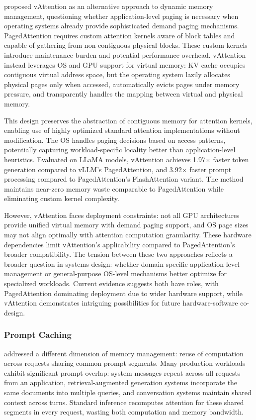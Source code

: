 \documentclass[11pt,letterpaper]{article}
\begin{document}
\cite{liu2024vattention} proposed vAttention as an alternative approach to dynamic memory management, questioning whether application-level paging is necessary when operating systems already provide sophisticated demand paging mechanisms. PagedAttention requires custom attention kernels aware of block tables and capable of gathering from non-contiguous physical blocks. These custom kernels introduce maintenance burden and potential performance overhead. vAttention instead leverages OS and GPU support for virtual memory: KV cache occupies contiguous virtual address space, but the operating system lazily allocates physical pages only when accessed, automatically evicts pages under memory pressure, and transparently handles the mapping between virtual and physical memory.

This design preserves the abstraction of contiguous memory for attention kernels, enabling use of highly optimized standard attention implementations without modification. The OS handles paging decisions based on access patterns, potentially capturing workload-specific locality better than application-level heuristics. Evaluated on LLaMA models, vAttention achieves 1.97$\times$ faster token generation compared to vLLM's PagedAttention, and 3.92$\times$ faster prompt processing compared to PagedAttention's FlashAttention variant. The method maintains near-zero memory waste comparable to PagedAttention while eliminating custom kernel complexity.

However, vAttention faces deployment constraints: not all GPU architectures provide unified virtual memory with demand paging support, and OS page sizes may not align optimally with attention computation granularity. These hardware dependencies limit vAttention's applicability compared to PagedAttention's broader compatibility. The tension between these two approaches reflects a broader question in systems design: whether domain-specific application-level management or general-purpose OS-level mechanisms better optimize for specialized workloads. Current evidence suggests both have roles, with PagedAttention dominating deployment due to wider hardware support, while vAttention demonstrates intriguing possibilities for future hardware-software co-design.

\subsubsection{Prompt Caching}

\cite{gao2024prompt} addressed a different dimension of memory management: reuse of computation across requests sharing common prompt segments. Many production workloads exhibit significant prompt overlap: system messages repeat across all requests from an application, retrieval-augmented generation systems incorporate the same documents into multiple queries, and conversation systems maintain shared context across turns. Standard inference recomputes attention for these shared segments in every request, wasting both computation and memory bandwidth.
\end{document}
